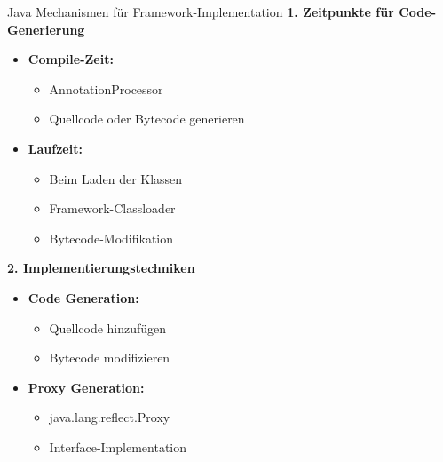 \begin{KR}{Java Mechanismen für Framework-Implementation}
\textbf{1. Zeitpunkte für Code-Generierung}
\begin{itemize}
    \item \textbf{Compile-Zeit:}
    \begin{itemize}
        \item AnnotationProcessor
        \item Quellcode oder Bytecode generieren
    \end{itemize}
    \item \textbf{Laufzeit:}
    \begin{itemize}
        \item Beim Laden der Klassen
        \item Framework-Classloader
        \item Bytecode-Modifikation
    \end{itemize}
\end{itemize}

\textbf{2. Implementierungstechniken}
\begin{itemize}
    \item \textbf{Code Generation:}
    \begin{itemize}
        \item Quellcode hinzufügen
        \item Bytecode modifizieren
    \end{itemize}
    \item \textbf{Proxy Generation:}
    \begin{itemize}
        \item java.lang.reflect.Proxy
        \item Interface-Implementation
    \end{itemize}
\end{itemize}
\end{KR}


